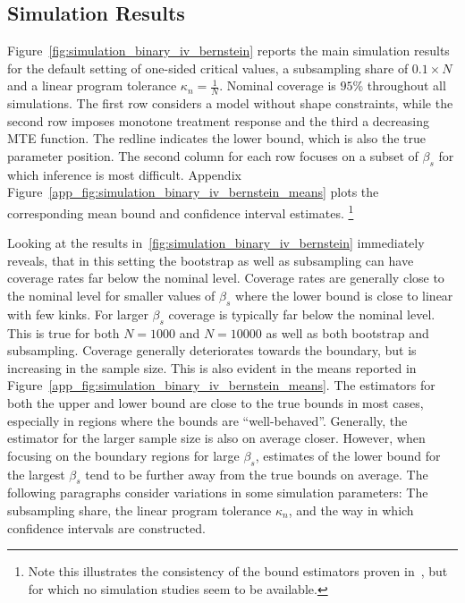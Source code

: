 \documentclass[12pt,a4paper,english]{article} %
\numberwithin{equation}{section}
\theoremstyle{definition}
\theoremstyle{remark}
\theoremstyle{plain}
\begin{document}
\subsection{Simulation Results}
Figure~\ref{fig:simulation_binary_iv_bernstein} reports the main simulation results for the default setting of one-sided critical values,  a subsampling share of $0.1\times N$ and a linear program tolerance $\kappa_n = \frac{1}{N}$.
Nominal coverage is $95$\% throughout all simulations. The first row considers a model without shape constraints, while the second row imposes monotone treatment response and the third a decreasing MTE function.
The redline indicates the lower bound, which is also the true parameter position.
The second column for each row focuses on a subset of $\beta_s$ for which inference is most difficult.
Appendix Figure~\ref{app_fig:simulation_binary_iv_bernstein_means} plots the corresponding mean bound and confidence interval estimates.
\footnote{Note this illustrates the consistency of the bound estimators proven in~\cite{mogstad2018using}, but for which no simulation studies seem to be available.}

Looking at the results in~\ref{fig:simulation_binary_iv_bernstein} immediately reveals, that in this setting the bootstrap as well as subsampling can have coverage rates far below the nominal level.
Coverage rates are generally close to the nominal level for smaller values of $\beta_s$ where the lower bound is close to linear with few kinks.
For larger $\beta_s$ coverage is typically far below the nominal level. This is true for both $N=1000$ and $N=10000$ as well as both bootstrap and subsampling.
Coverage generally deteriorates towards the boundary, but is increasing in the sample size.
This is also evident in the means reported in Figure~\ref{app_fig:simulation_binary_iv_bernstein_means}.
The estimators for both the upper and lower bound are close to the true bounds in most cases, especially in regions where the bounds are ``well-behaved''.
Generally, the estimator for the larger sample size is also on average closer.
However, when focusing on the boundary regions for large $\beta_s$, estimates of the lower bound for the largest $\beta_s$ tend to be further away from the true bounds on average.
The following paragraphs consider variations in some simulation parameters: The subsampling share, the linear program tolerance $\kappa_n$, and the way in which confidence intervals are constructed.
\end{document}
